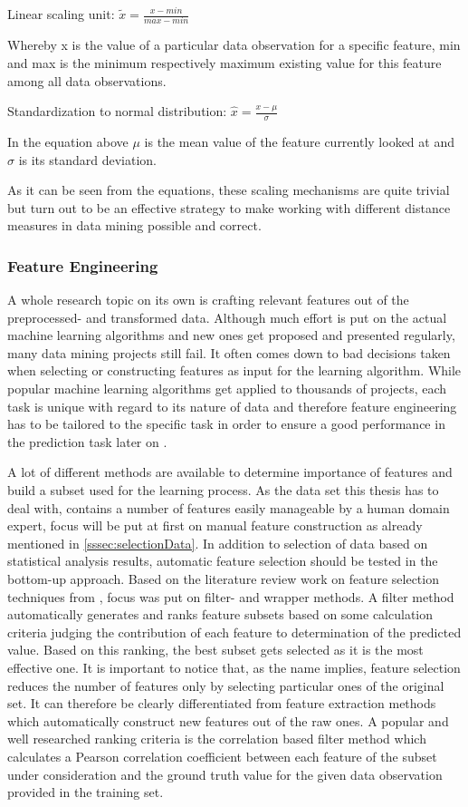 Linear scaling unit: $\tilde{x} = \frac{x - min}{max - min}$

Whereby x is the value of a particular data observation for a specific feature, min and max is the minimum respectively maximum existing value for this feature among all data observations. 

Standardization to normal distribution: $\hat{x} = \frac{x - \mu}{\sigma}$

In the equation above $\mu$ is the mean value of the feature currently looked at and $\sigma$ is its standard deviation.

As it can be seen from the equations, these scaling mechanisms are quite trivial but turn out to be an effective strategy to make working with different distance measures in data mining possible and correct.

\subsubsection{Feature Engineering}
\label{sssec:featureEngineering}
A whole research topic on its own is crafting relevant features out of the preprocessed- and transformed data. Although much effort is put on the actual machine learning algorithms and new ones get proposed and presented regularly, many data mining projects still fail. It often comes down to bad decisions taken when selecting or constructing features as input for the learning algorithm. While popular machine learning algorithms get applied to thousands of projects, each task is unique with regard to its nature of data and therefore feature engineering has to be tailored to the specific task in order to ensure a good performance in the prediction task later on \cite{domingos2012few}. 

A lot of different methods are available to determine importance of features and build a subset used for the learning process. As the data set this thesis has to deal with, contains a number of features easily manageable by a human domain expert, focus will be put at first on manual feature construction as already mentioned in \ref{sssec:selectionData}. In addition to selection of data based on statistical analysis results, automatic feature selection should be tested in the bottom-up approach. Based on the literature review work on feature selection techniques from \cite{chandrashekar2014survey}, focus was put on filter- and wrapper methods. A filter method automatically generates and ranks feature subsets based on some calculation criteria judging the contribution of each feature to determination of the predicted value. Based on this ranking, the best subset gets selected as it is the most effective one. It is important to notice that, as the name implies, feature selection reduces the number of features only by selecting particular ones of the original set. It can therefore be clearly differentiated from feature extraction methods which automatically construct new features out of the raw ones. A popular and well researched ranking criteria is the correlation based filter method which calculates a Pearson correlation coefficient between each feature of the subset under consideration and the ground truth value for the given data observation provided in the training set. 


